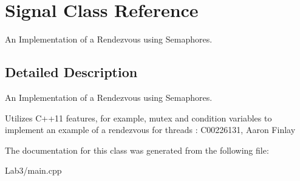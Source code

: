 \hypertarget{class_signal}{}\section{Signal Class Reference}
\label{class_signal}


An Implementation of a Rendezvous using Semaphores.  




\subsection{Detailed Description}
An Implementation of a Rendezvous using Semaphores. 

Utilizes C++11 features, for example, mutex and condition variables to implement an example of a rendezvous for threads \+: C00226131, Aaron Finlay 

The documentation for this class was generated from the following file\+:\begin{DoxyCompactItemize}
\item 
Lab3/main.\+cpp\end{DoxyCompactItemize}
